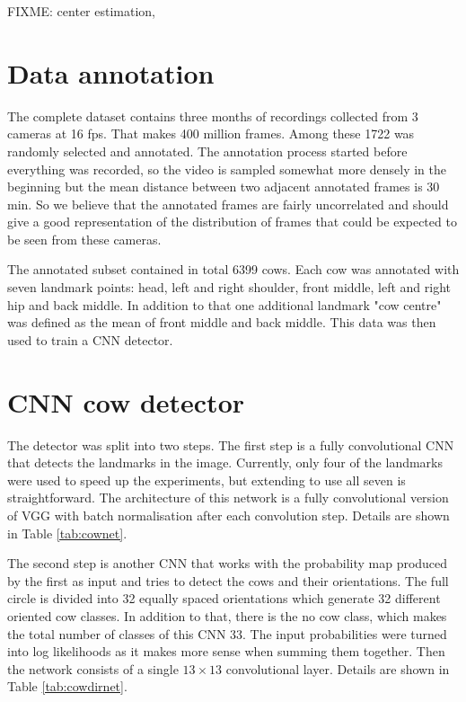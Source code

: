 \documentclass{IET}
\begin{document}
FIXME: center estimation, 

\section{Data annotation}

The complete dataset contains three months of recordings collected from 3 cameras at 16 fps. That makes 400 million frames. Among these 1722 was randomly selected and annotated. The annotation process started before everything was recorded, so the video is sampled somewhat more densely in the beginning but the mean distance between two adjacent annotated frames is 30 min. So we believe that the annotated frames are fairly uncorrelated and should give a good representation of the distribution of frames that could be expected to be seen from these cameras.

The annotated subset contained in total 6399 cows. Each cow was annotated with seven landmark points: head, left and right shoulder, front middle, left and right hip and back middle. In addition to that one additional landmark "cow centre" was defined as the mean of front middle and back middle. This data was then used to train a CNN detector.


\section{CNN cow detector}

The detector was split into two steps. The first step is a fully convolutional CNN that detects the landmarks in the image. Currently, only four of the landmarks were used to speed up the experiments, but extending to use all seven is straightforward. The architecture of this network is a fully convolutional version of VGG \cite{Simonyan14c} with batch normalisation \cite{DBLP:journals/corr/IoffeS15} after each convolution step. Details are shown in Table \ref{tab:cownet}.

The second step is another CNN that works with the probability map produced by the first as input and tries to detect the cows and their orientations. The full circle is divided into 32 equally spaced orientations which generate 32 different oriented cow classes. In addition to that, there is the no cow class, which makes the total number of classes of this CNN 33. The input probabilities were turned into log likelihoods as it makes more sense when summing them together. Then the network consists of a single $ 13 \times 13 $ convolutional layer. Details are shown in Table \ref{tab:cowdirnet}.
\end{document}
